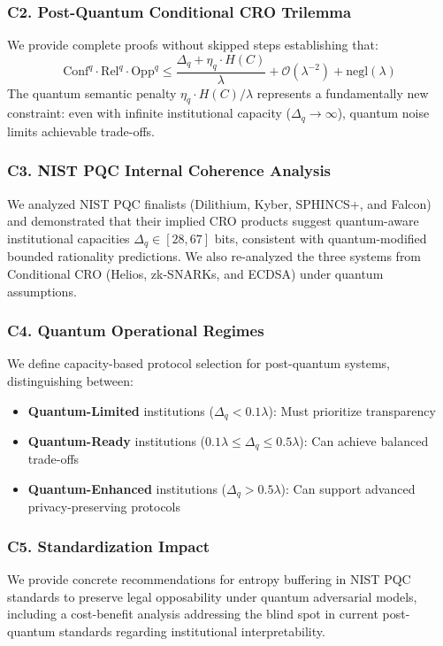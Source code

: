 \documentclass{ieeeaccess}
\begin{document}
\subsubsection{C2. Post-Quantum Conditional CRO Trilemma}
We provide complete proofs without skipped steps establishing that:
\[
\text{Conf}^q \cdot \text{Rel}^q \cdot \text{Opp}^q \leq \frac{\Delta_q + \eta_q \cdot H(C)}{\lambda} + \mathcal{O}(\lambda^{-2}) + \text{negl}(\lambda)
\]
The quantum semantic penalty $\eta_q \cdot H(C)/\lambda$ represents a fundamentally new constraint: even with infinite institutional capacity ($\Delta_q \to \infty$), quantum noise limits achievable trade-offs.

\subsubsection{C3. NIST PQC Internal Coherence Analysis}
We analyzed NIST PQC finalists (Dilithium, Kyber, SPHINCS+, and Falcon) and demonstrated that their implied CRO products suggest quantum-aware institutional capacities $\Delta_q \in [28, 67]$ bits, consistent with quantum-modified bounded rationality predictions. We also re-analyzed the three systems from Conditional CRO (Helios, zk-SNARKs, and ECDSA) under quantum assumptions.

\subsubsection{C4. Quantum Operational Regimes}
We define capacity-based protocol selection for post-quantum systems, distinguishing between:
\begin{itemize}
    \item \textbf{Quantum-Limited} institutions ($\Delta_q < 0.1\lambda$): Must prioritize transparency
    \item \textbf{Quantum-Ready} institutions ($0.1\lambda \leq \Delta_q \leq 0.5\lambda$): Can achieve balanced trade-offs
    \item \textbf{Quantum-Enhanced} institutions ($\Delta_q > 0.5\lambda$): Can support advanced privacy-preserving protocols
\end{itemize}

\subsubsection{C5. Standardization Impact}
We provide concrete recommendations for entropy buffering in NIST PQC standards to preserve legal opposability under quantum adversarial models, including a cost-benefit analysis addressing the blind spot in current post-quantum standards regarding institutional interpretability.
\end{document}
